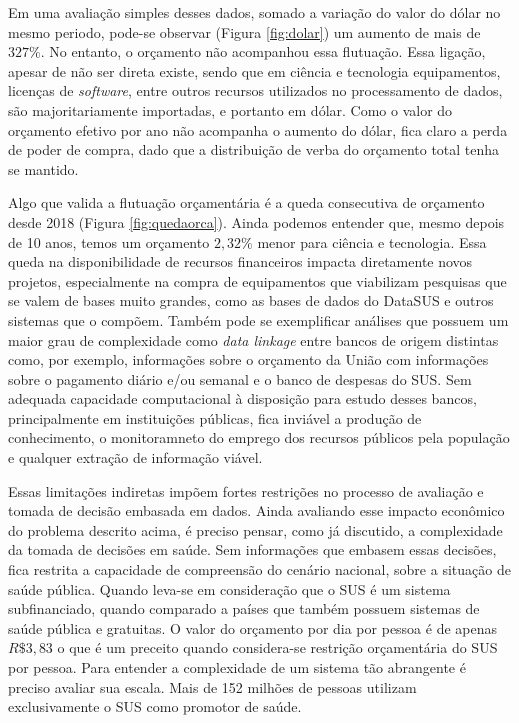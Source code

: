 Em uma avaliação simples desses dados, somado a variação do valor do dólar no mesmo periodo, pode-se observar (Figura \ref{fig:dolar}) um aumento de mais de $327\%$. No entanto,  o orçamento não acompanhou essa flutuação. Essa ligação, apesar de não ser direta existe, sendo que em ciência e tecnologia equipamentos, licenças de \emph{software}, entre outros recursos utilizados no processamento de dados, são majoritariamente importadas, e portanto em dólar. Como o valor do orçamento efetivo por ano não acompanha o aumento do dólar, fica claro a perda de poder de compra, dado que a distribuição de verba do orçamento total tenha se mantido. 

Algo que valida a flutuação orçamentária é a queda consecutiva de orçamento desde 2018 (Figura \ref{fig:quedaorca}). Ainda podemos entender que, mesmo depois de 10 anos, temos um orçamento $2,32\%$ menor para ciência e tecnologia. Essa queda na disponibilidade de recursos financeiros impacta diretamente novos projetos, especialmente na compra de equipamentos que viabilizam pesquisas que se valem de bases muito grandes, como as bases de dados do DataSUS e outros sistemas que o compõem. Também pode se exemplificar análises que possuem um maior grau de complexidade como \emph{data linkage} entre bancos de origem distintas como, por exemplo, informações sobre o orçamento da União com informações sobre o pagamento diário e/ou semanal e o banco de despesas do SUS. Sem adequada capacidade computacional à disposição para estudo desses bancos, principalmente em instituições públicas, fica inviável a produção de conhecimento, o monitoramneto do emprego dos recursos públicos pela população e qualquer extração de informação viável. 

Essas limitações indiretas impõem fortes restrições no processo de avaliação e tomada de decisão embasada em dados. Ainda avaliando esse impacto econômico do problema descrito acima, é preciso pensar, como já discutido, a complexidade da tomada de decisões em saúde. Sem informações que embasem essas decisões, fica restrita a capacidade de compreensão do cenário nacional, sobre a situação de saúde pública. Quando leva-se em consideração que o SUS é um sistema subfinanciado, quando comparado a países que também possuem sistemas de saúde pública e gratuitas. O valor do orçamento por dia por pessoa é de apenas $R\$ 3,83$  o que é um preceito quando considera-se  restrição orçamentária do SUS por pessoa. Para entender a complexidade de um sistema tão abrangente é preciso avaliar sua escala. Mais de 152 milhões de pessoas utilizam exclusivamente o SUS como promotor de saúde. 

